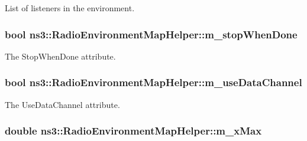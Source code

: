 List of listeners in the environment. 

\subsubsection[{\texorpdfstring{m\+\_\+stop\+When\+Done}{m_stopWhenDone}}]{\setlength{\rightskip}{0pt plus 5cm}bool ns3\+::\+Radio\+Environment\+Map\+Helper\+::m\+\_\+stop\+When\+Done\hspace{0.3cm}{\ttfamily [private]}}\hypertarget{classns3_1_1RadioEnvironmentMapHelper_afe704d7c118eec931eb586fdef6f6382}{}\label{classns3_1_1RadioEnvironmentMapHelper_afe704d7c118eec931eb586fdef6f6382}


The {\ttfamily Stop\+When\+Done} attribute. 

\subsubsection[{\texorpdfstring{m\+\_\+use\+Data\+Channel}{m_useDataChannel}}]{\setlength{\rightskip}{0pt plus 5cm}bool ns3\+::\+Radio\+Environment\+Map\+Helper\+::m\+\_\+use\+Data\+Channel\hspace{0.3cm}{\ttfamily [private]}}\hypertarget{classns3_1_1RadioEnvironmentMapHelper_a498cc85b6a5abb1eee18c95274963c45}{}\label{classns3_1_1RadioEnvironmentMapHelper_a498cc85b6a5abb1eee18c95274963c45}


The {\ttfamily Use\+Data\+Channel} attribute. 

\subsubsection[{\texorpdfstring{m\+\_\+x\+Max}{m_xMax}}]{\setlength{\rightskip}{0pt plus 5cm}double ns3\+::\+Radio\+Environment\+Map\+Helper\+::m\+\_\+x\+Max\hspace{0.3cm}{\ttfamily [private]}}\hypertarget{classns3_1_1RadioEnvironmentMapHelper_aa5f098561e72eacb242a5ecbb65a882f}{}\label{classns3_1_1RadioEnvironmentMapHelper_aa5f098561e72eacb242a5ecbb65a882f}


